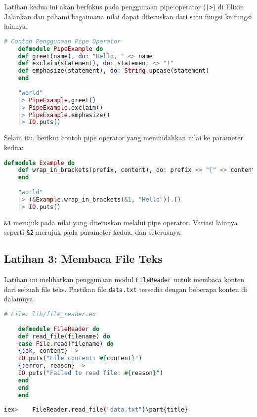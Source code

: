 Latihan kedua ini akan berfokus pada penggunaan pipe operator (\texttt{|>}) di Elixir. Jalankan dan pahami bagaimana nilai dapat diteruskan dari satu fungsi ke fungsi lainnya.

\begin{lstlisting}[language=Elixir]
	# Contoh Penggunaan Pipe Operator
	defmodule PipeExample do
	def greet(name), do: "Hello, " <> name
	def exclaim(statement), do: statement <> "!"
	def emphasize(statement), do: String.upcase(statement)
	end
	
	"world"
	|> PipeExample.greet()
	|> PipeExample.exclaim()
	|> PipeExample.emphasize()
	|> IO.puts()
\end{lstlisting}

Selain itu, berikut contoh pipe operator yang memindahkan nilai ke parameter kedua:

\begin{lstlisting}[language=Elixir]
	defmodule Example do
	def wrap_in_brackets(prefix, content), do: prefix <> "[" <> content <> "]"
	end
	
	"world"
	|> (&Example.wrap_in_brackets(&1, "Hello")).()
	|> IO.puts()
\end{lstlisting}

\texttt{\&1} merujuk pada nilai yang diteruskan melalui pipe operator. Variasi lainnya seperti \texttt{\&2} merujuk pada parameter kedua, dan seterusnya.

\subsection{Latihan 3: Membaca File Teks}

Latihan ini melibatkan penggunaan modul \texttt{FileReader} untuk membaca konten dari sebuah file teks. Pastikan file \texttt{data.txt} tersedia dengan beberapa konten di dalamnya.

\begin{lstlisting}[language=Elixir]
	# File: lib/file_reader.ex
	
	defmodule FileReader do
	def read_file(filename) do
	case File.read(filename) do
	{:ok, content} ->
	IO.puts("File content: #{content}")
	{:error, reason} ->
	IO.puts("Failed to read file: #{reason}")
	end
	end
	end
\end{lstlisting}

\begin{lstlisting}[language=bash]
	iex> 	FileReader.read_file("data.txt")\part{title}
\end{lstlisting}

